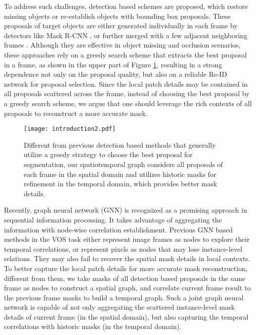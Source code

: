 \documentclass[letterpaper]{article} \usepackage{aaai21}  \usepackage{times}  \usepackage{helvet} \usepackage{courier}  \usepackage[hyphens]{url}  \usepackage{graphicx} \urlstyle{rm} \def\UrlFont{\rm}  \usepackage{graphicx}  \usepackage{natbib}  \usepackage{caption} \frenchspacing  \setlength{\pdfpagewidth}{8.5in}  \setlength{\pdfpageheight}{11in}  \usepackage{amsmath}
\begin{document}
To address such challenges, detection based schemes \cite{li2017video,luiten2018premvos} are proposed, which 
restore missing objects or re-establish objects with bounding box proposals. These proposals of target objects are either generated individually in each frame by detectors like Mask R-CNN \cite{he2017mask}, or further merged with a few adjacent neighboring frames \cite{luiten2018premvos}.
Although they are effective in object missing and occlusion scenarios,
these approaches rely on a greedy search scheme that extracts the best proposal in a frame, as shown in the upper part of Figure \ref{fig:introduction}, resulting in a strong dependence not only on the proposal quality, but also on a reliable Re-ID network \cite{li2017video} for proposal selection. 
Since the local patch details may be contained in all proposals scattered across the frame, instead of choosing the best proposal by a greedy search scheme, we argue that one should leverage the rich contexts of all proposals to reconstruct a more accurate mask.

\begin{figure}[t]
\centering
\texttt{[image: introduction2.pdf]}
\caption{Different from previous detection based methods that generally utilize a greedy strategy to choose the best proposal for segmentation, our spatiotemporal graph considers all proposals of each frame in the spatial domain and utilizes historic masks for refinement in the temporal domain, which provides better mask details.}
\label{fig:introduction}
\vspace{-10pt}
\end{figure}

Recently, graph neural network (GNN) \cite{scarselli2008graph,gilmer2017neural,cheng2020spatio,cheng2020graph,liu2020jointly} is recognized as a promising approach in sequential information processing. It takes advantage of aggregating the information with node-wise correlation establishment.
Previous GNN based methods \cite{wang2019zero,haller2019spacetime,bao2018cnn} in the VOS task either represent image frames as nodes to explore their temporal correlations, or represent pixels as nodes that may lose instance-level relations. They may also fail to recover the spatial mask details in local contexts.
To better capture the local patch details for more accurate mask reconstruction, different from them, we take masks of all detection based proposals in the same frame as nodes to construct a spatial graph, and correlate current frame result to the previous frame masks to build a temporal graph. Such a joint graph neural network is capable of not only aggregating the scattered instance-level mask details of current frame (in the spatial domain), but also capturing the temporal correlations with historic masks (in the temporal domain).
\end{document}
